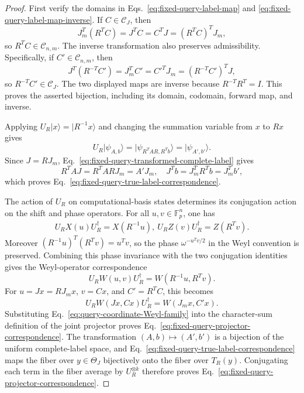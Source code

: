 \documentclass[11pt]{article}
\newcommand{\F}{\mathbb F}
\newcommand{\1}{\mathbf 1}
\newcommand{\ket}[1]{\lvert #1\rangle}
\theoremstyle{plain}
\theoremstyle{definition}
\theoremstyle{remark}
\begin{document}
\begin{proof}
First verify the domains in Eqs.~\eqref{eq:fixed-query-label-map} and
\eqref{eq:fixed-query-label-map-inverse}.  If $C\in\mathcal C_J$, then
\begin{equation}
 J_m^T(R^TC)=J^TC=C^TJ=(R^TC)^TJ_m,
 \label{eq:fixed-query-forward-admissibility}
\end{equation}
so $R^TC\in\mathcal C_{n,m}$.  The inverse transformation also preserves
admissibility.  Specifically, if $C'\in\mathcal C_{n,m}$, then
\begin{equation}
 J^T(R^{-T}C')=J_m^TC'=C'^TJ_m=(R^{-T}C')^TJ,
 \label{eq:fixed-query-inverse-admissibility}
\end{equation}
so $R^{-T}C'\in\mathcal C_J$.  The two displayed maps are inverse because
$R^{-T}R^T=I$.  This proves the asserted bijection, including its domain,
codomain, forward map, and inverse.

Applying $U_R\ket{x}=\ket{R^{-1}x}$ and changing the summation variable
from $x$ to $Rx$ gives
\begin{equation}
 U_R\ket{\psi_{A,b}}=\ket{\psi_{R^TAR,R^Tb}}
 =\ket{\psi_{A',b'}}.
 \label{eq:fixed-query-state-correspondence}
\end{equation}
Since $J=RJ_m$, Eq.~\eqref{eq:fixed-query-transformed-complete-label} gives
\begin{equation}
 R^TAJ=R^TARJ_m=A'J_m,
 \quad
 J^Tb=J_m^TR^Tb=J_m^Tb',
 \label{eq:fixed-query-true-coordinate-calculation}
\end{equation}
which proves Eq.~\eqref{eq:fixed-query-true-label-correspondence}.

The action of $U_R$ on computational-basis states determines its conjugation
action on the shift and phase operators.  For all $u,v\in\F_p^n$, one has
\begin{align}
 U_RX(u)U_R^\dagger=X(R^{-1}u),~
 U_RZ(v)U_R^\dagger=Z(R^Tv).
 \label{eq:fixed-query-Z-conjugation}
\end{align}
Moreover $(R^{-1}u)^T(R^Tv)=u^Tv$, so the phase
$\omega^{-u^Tv/2}$ in the Weyl convention is preserved.  Combining this phase
invariance with the two conjugation identities gives the Weyl-operator
correspondence
\begin{equation}
 U_RW(u,v)U_R^\dagger=W(R^{-1}u,R^Tv).
 \label{eq:fixed-query-general-Weyl-conjugation}
\end{equation}
For $u=Jx=RJ_mx$, $v=Cx$, and $C'=R^TC$, this becomes
\begin{equation}
 U_RW(Jx,Cx)U_R^\dagger=W(J_mx,C'x).
 \label{eq:query-coordinate-Weyl-family}
\end{equation}
Substituting Eq.~\eqref{eq:query-coordinate-Weyl-family} into the character-sum
definition of the joint projector proves
Eq.~\eqref{eq:fixed-query-projector-correspondence}.  The transformation
$(A,b)\mapsto(A',b')$ is a bijection of the uniform complete-label space, and
Eq.~\eqref{eq:fixed-query-true-label-correspondence} maps the fiber over
$y\in\Theta_J$ bijectively onto the fiber over $T_R(y)$.  Conjugating each term
in the fiber average by $U_R^{\otimes k}$ therefore proves
Eq.~\eqref{eq:fixed-query-projector-correspondence}.


\end{proof}
\end{document}
